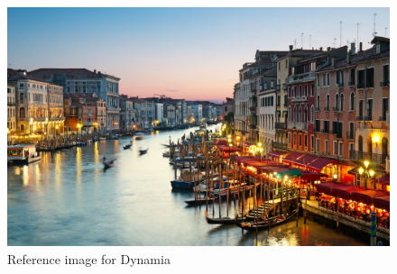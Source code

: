 \begin{figure}[H]
  \centering
  \includegraphics[width=\textwidth]{../../References/Images/Dynamia/venice-restaurants-by-canal}
  \caption{Reference image for Dynamia}
\end{figure}
\hspace{0pt} \\ %
